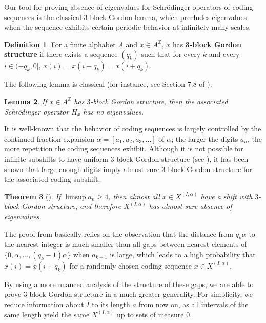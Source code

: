 \documentclass[11pt,reqno]{amsart}
\newtheorem{theorem}{Theorem}[section]
\newtheorem{lemma}[theorem]{Lemma}
\theoremstyle{definition}
\newtheorem{definition}[theorem]{Definition}
\theoremstyle{plain}
\begin{document}
Our tool for proving absence of eigenvalues for Schr\"{o}dinger operators of coding sequences is the classical $3$-block Gordon lemma, which precludes eigenvalues when the sequence exhibits certain periodic behavior at infinitely many scales.
\begin{definition}
For a finite alphabet $A$ and $x \in A^{\mathbb{Z}}$, $x$ has \textbf{3-block Gordon structure} if there exists a sequence $(q_k)$ such that for every $k$ and every $i \in (-q_k, 0]$, $x(i) = x(i - q_k) = x(i + q_k)$.
\end{definition}

The following lemma is classical (for instance, see Section 7.8 of \cite{schrobook}).

\begin{lemma}\label{gordon}
If $x \in A^\mathbb{Z}$ has $3$-block Gordon structure, then the associated Schr\"{o}dinger operator $H_x$ has no eigenvalues.
\end{lemma}

It is well-known that the behavior of coding sequences is largely controlled by the continued fraction expansion $\alpha = [a_1, a_2, a_3, \ldots]$ of $\alpha$; the larger the digits $a_n$, the more repetition the coding sequences exhibit. Although it is not possible for infinite subshifts to have uniform $3$-block Gordon structure (see \cite{no3block}), it has been shown that large enough digits imply almost-sure $3$-block Gordon structure for the associated coding subshift.

\begin{theorem}[\cite{kaminaga}]\label{kaminaga}
If $\limsup a_n \geq 4$, then almost all $x \in X^{(I, \alpha)}$ have a shift with $3$-block Gordon structure, and therefore $X^{(I, \alpha)}$ has almost-sure absence of eigenvalues.
\end{theorem}

The proof from \cite{kaminaga} basically relies on the observation that the distance from $q_k \alpha$ to the nearest integer is much smaller than all gaps between nearest elements of $\{0, \alpha, \ldots, (q_k-1)\alpha\}$ when $a_{k+1}$ is large, which leads to a high probability that $x(i) = x(i \pm q_k)$ for a randomly chosen coding sequence
$x \in X^{(I, \alpha)}$.

By using a more nuanced analysis of the structure of these gaps, we are able to prove $3$-block Gordon structure in a much greater generality. For simplicity, we reduce information about $I$ to its length $a$ from now on, 
as all intervals of the same length yield the same $X^{(I, \alpha)}$ up to sets of measure $0$.
\end{document}

